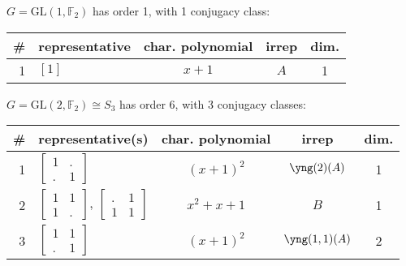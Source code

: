 \documentclass[11pt,oneside]{article}
\newcommand{\GL}{\mathrm{GL}}
\newcommand{\Field}{\mathbb{F}}
\begin{document}

\setlength{\tabcolsep}{10pt}
\setlength{\arraycolsep}{1pt}
\renewcommand{\arraystretch}{0.5}


$G=\GL(1,\Field_2)$ has order 1, with 1 conjugacy class:
\begin{center}
\begin{tabular}{r|l|c|c|c}
\# & representative & char. polynomial & irrep & dim. \\
\hline
1 & $[1]$           & $x+1$            & $A$   & 1    \\
\end{tabular}
\end{center}

$G=\GL(2,\Field_2) \cong S_3$ has order 6, with 3 conjugacy classes:
\begin{center}
\begin{tabular}{r|l|c|c|c}
\# & representative(s) & char. polynomial & irrep & dim. \\
\hline
1  & $\begin{bmatrix}1&.\\.&1\end{bmatrix}$    & $(x+1)^2$  & $\yng(2)(A)$  & 1 \\
2  & $\begin{bmatrix}1&1\\1&.\end{bmatrix}$, $\begin{bmatrix}.&1\\1&1\end{bmatrix}$     & $x^2+x+1$  &  $B$  & 1 \\
3  & $\begin{bmatrix}1&1\\.&1\end{bmatrix}$    & $(x+1)^2$  & $\yng(1,1)(A)$ & 2  \\
\end{tabular}
\end{center}
\end{document}
